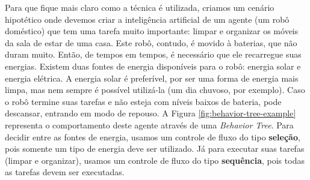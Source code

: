 Para que fique mais claro como a técnica é utilizada, criamos um cenário
hipotético onde devemos criar a inteligência artificial de um agente (um robô
doméstico) que tem uma tarefa muito importante: limpar e organizar os móveis da
sala de estar de uma casa. Este robô, contudo, é movido à baterias, que não
duram muito. Então, de tempos em tempos, é necessário que ele recarregue suas
energias. Existem duas fontes de energia disponíveis para o robô: energia solar
e energia elétrica. A energia solar é preferível, por ser uma forma de energia
mais limpa, mas nem sempre é possível utilizá-la (um dia chuvoso, por exemplo).
Caso o robô termine suas tarefas e não esteja com níveis baixos de bateria, pode
descansar, entrando em modo de repouso.  A Figura
\ref{fig:behavior-tree-example} representa o comportamento deste agente através
de uma \textit{Behavior Tree}. Para decidir entre as fontes de energia, usamos
um controle de fluxo do tipo \textbf{seleção}, pois somente um tipo de energia
deve ser utilizado. Já para executar suas tarefas (limpar e organizar), usamos
um controle de fluxo do tipo \textbf{sequência}, pois todas as tarefas devem ser
executadas.

